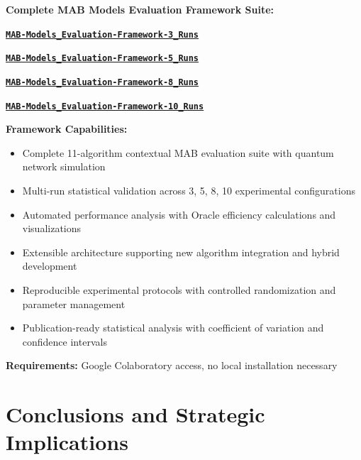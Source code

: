 \documentclass[12pt,a4paper]{article}
\newcommand{\colab}[1]{\textcolor{colabcolor}{\textbf{#1}}}
\begin{document}
\begin{tcolorbox}[colback=colabcolor!20,colframe=colabcolor,title=\textbf{Comprehensive Evaluation Framework Access}]

\begin{center}
\textbf{Complete MAB Models Evaluation Framework Suite:}
\vspace{0.3cm}

\href{https://colab.research.google.com/drive/MAB-Models-Evaluation-3-Runs}{\colab{\texttt{MAB-Models\_Evaluation-Framework-3\_Runs}}}

\href{https://colab.research.google.com/drive/MAB-Models-Evaluation-5-Runs}{\colab{\texttt{MAB-Models\_Evaluation-Framework-5\_Runs}}}

\href{https://colab.research.google.com/drive/MAB-Models-Evaluation-8-Runs}{\colab{\texttt{MAB-Models\_Evaluation-Framework-8\_Runs}}}

\href{https://colab.research.google.com/drive/MAB-Models-Evaluation-10-Runs}{\colab{\texttt{MAB-Models\_Evaluation-Framework-10\_Runs}}}

\vspace{0.3cm}
\textbf{Framework Capabilities:}
\begin{itemize}
\item Complete 11-algorithm contextual MAB evaluation suite with quantum network simulation
\item Multi-run statistical validation across 3, 5, 8, 10 experimental configurations
\item Automated performance analysis with Oracle efficiency calculations and visualizations
\item Extensible architecture supporting new algorithm integration and hybrid development
\item Reproducible experimental protocols with controlled randomization and parameter management
\item Publication-ready statistical analysis with coefficient of variation and confidence intervals
\end{itemize}

\textbf{Requirements:} Google Colaboratory access, no local installation necessary
\end{center}
\end{tcolorbox}

\section{Conclusions and Strategic Implications}
\end{document}
